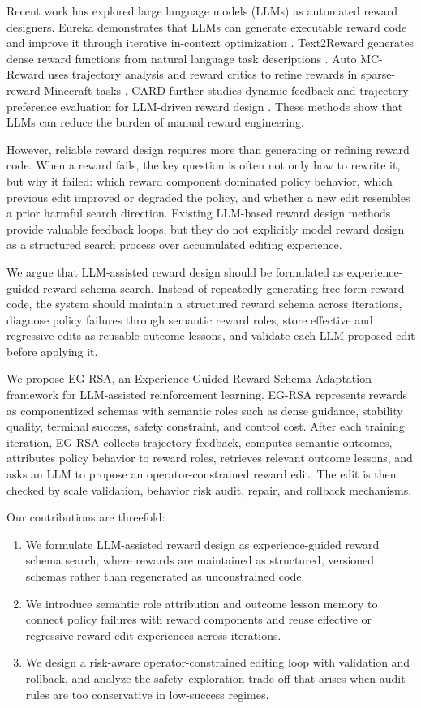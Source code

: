 \documentclass[11pt]{article}
\begin{document}
Recent work has explored large language models (LLMs) as automated reward designers. Eureka demonstrates that LLMs can generate executable reward code and improve it through iterative in-context optimization \citep{ma2023eureka}. Text2Reward generates dense reward functions from natural language task descriptions \citep{xie2023text2reward}. Auto MC-Reward uses trajectory analysis and reward critics to refine rewards in sparse-reward Minecraft tasks \citep{li2023automcreward}. CARD further studies dynamic feedback and trajectory preference evaluation for LLM-driven reward design \citep{sun2024card}. These methods show that LLMs can reduce the burden of manual reward engineering.

However, reliable reward design requires more than generating or refining reward code. When a reward fails, the key question is often not only how to rewrite it, but why it failed: which reward component dominated policy behavior, which previous edit improved or degraded the policy, and whether a new edit resembles a prior harmful search direction. Existing LLM-based reward design methods provide valuable feedback loops, but they do not explicitly model reward design as a structured search process over accumulated editing experience.

We argue that LLM-assisted reward design should be formulated as experience-guided reward schema search. Instead of repeatedly generating free-form reward code, the system should maintain a structured reward schema across iterations, diagnose policy failures through semantic reward roles, store effective and regressive edits as reusable outcome lessons, and validate each LLM-proposed edit before applying it.

We propose EG-RSA, an Experience-Guided Reward Schema Adaptation framework for LLM-assisted reinforcement learning. EG-RSA represents rewards as componentized schemas with semantic roles such as dense guidance, stability quality, terminal success, safety constraint, and control cost. After each training iteration, EG-RSA collects trajectory feedback, computes semantic outcomes, attributes policy behavior to reward roles, retrieves relevant outcome lessons, and asks an LLM to propose an operator-constrained reward edit. The edit is then checked by scale validation, behavior risk audit, repair, and rollback mechanisms.

Our contributions are threefold:
\begin{enumerate}[leftmargin=*,nosep]
    \item We formulate LLM-assisted reward design as experience-guided reward schema search, where rewards are maintained as structured, versioned schemas rather than regenerated as unconstrained code.
    \item We introduce semantic role attribution and outcome lesson memory to connect policy failures with reward components and reuse effective or regressive reward-edit experiences across iterations.
    \item We design a risk-aware operator-constrained editing loop with validation and rollback, and analyze the safety--exploration trade-off that arises when audit rules are too conservative in low-success regimes.
\end{enumerate}
\end{document}
